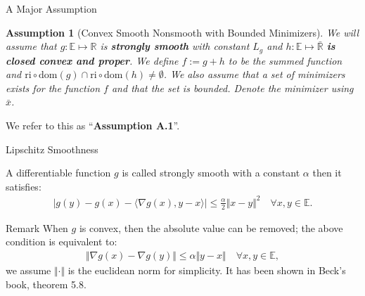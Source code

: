 \documentclass[11pt]{beamer}
\newtheorem{assumption}{Assumption}
\begin{document}
        \begin{frame}{A Major Assumption}
            \begin{assumption}[Convex Smooth Nonsmooth with Bounded Minimizers]\label{assumption:1}
                We will assume that $g:\mathbb E\mapsto \mathbb R$ is \textbf{strongly smooth} with constant $L_g$ and $h:\mathbb E \mapsto \bar{\mathbb R}$ \textbf{is closed convex and proper}. We define $f := g + h$ to be the summed function and $\text{ri}\circ \text{dom}(g) \cap \text{ri}\circ \text{dom}(h) \neq \emptyset$. We also assume that a set of minimizers exists for the function $f$ and that the set is bounded. Denote the minimizer using $\bar x$. 
            \end{assumption}
            We refer to this as ``\textbf{Assumption A.1}''. 
        \end{frame}
        \begin{frame}{Lipschitz Smoothness}
            \begin{definition}\label{def:strong_smoothness}
                A differentiable function $g$ is called strongly smooth with a constant $\alpha$ then it satisfies: 
                \begin{align}
                    |g(y) - g(x) - 
                    \langle \nabla g(x), y - x
                    \rangle| \le \frac{\alpha}{2}\Vert x - y\Vert^2
                    \quad \forall x, y\in \mathbb E. 
                \end{align}    
            \end{definition}
            \begin{block}{Remark}
                When $g$ is convex, then the absolute value can be removed; the above condition is equivalent to: 
                \begin{align*}
                   \Vert \nabla g(x) - \nabla g(y)\Vert \le \alpha\Vert y - x \Vert\quad 
                   \forall x, y \in \mathbb E,
                \end{align*}
                we assume $\Vert \cdot\Vert$ is the euclidean norm for simplicity. It has been shown in Beck's book, theorem 5.8\cite{book:first_order_opt}. 
            \end{block}
        \end{frame}
\end{document}
